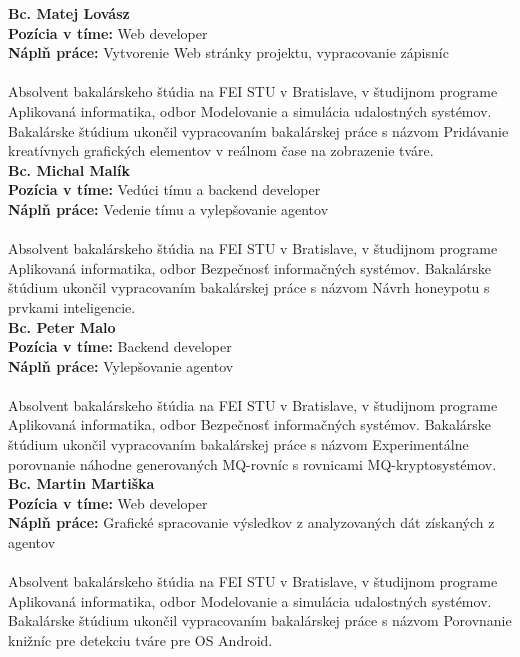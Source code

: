 \documentclass[a4paper,12pt]{article}
\begin{document}
\noindent \textbf{Bc. Matej Lovász} \\
\textbf{Pozícia v tíme: } Web developer \\ 
\textbf{Náplň práce:} Vytvorenie Web stránky projektu, vypracovanie zápisníc \\ \\
Absolvent bakalárskeho štúdia na FEI STU v Bratislave, v študijnom programe Aplikovaná informatika, odbor Modelovanie a simulácia udalostných systémov. Bakalárske štúdium ukončil vypracovaním bakalárskej práce s názvom Pridávanie kreatívnych grafických elementov v reálnom čase na zobrazenie tváre. \\ 

\noindent \textbf{Bc. Michal Malík} \\
\textbf{Pozícia v tíme: } Vedúci tímu a backend developer \\ 
\textbf{Náplň práce:} Vedenie tímu a vylepšovanie agentov \\ \\
Absolvent bakalárskeho štúdia na FEI STU v Bratislave, v študijnom programe Aplikovaná informatika, odbor Bezpečnosť informačných systémov. Bakalárske štúdium ukončil vypracovaním bakalárskej práce s názvom Návrh honeypotu s prvkami inteligencie. \\ 

\noindent \textbf{Bc. Peter Malo} \\
\textbf{Pozícia v tíme: } Backend developer \\ 
\textbf{Náplň práce:} Vylepšovanie agentov \\ \\
Absolvent bakalárskeho štúdia na FEI STU v Bratislave, v študijnom programe Aplikovaná informatika, odbor Bezpečnosť informačných systémov. Bakalárske štúdium ukončil vypracovaním bakalárskej práce s názvom Experimentálne porovnanie náhodne generovaných MQ-rovníc s rovnicami MQ-kryptosystémov. \\ 

\noindent \textbf{Bc. Martin Martiška} \\
\textbf{Pozícia v tíme: } Web developer \\ 
\textbf{Náplň práce:} Grafické spracovanie výsledkov z analyzovaných dát získaných z agentov \\ \\
Absolvent bakalárskeho štúdia na FEI STU v Bratislave, v študijnom programe Aplikovaná informatika, odbor Modelovanie a simulácia udalostných systémov. Bakalárske štúdium ukončil vypracovaním bakalárskej práce s názvom Porovnanie knižníc pre detekciu tváre pre OS Android. \\ 
\end{document}

